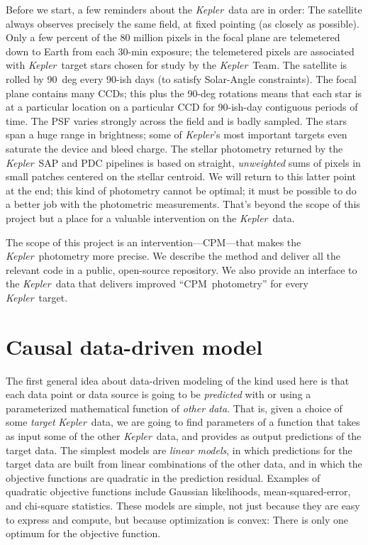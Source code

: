 \documentclass[12pt, preprint]{aastex}
\newcommand{\project}[1]{\textsl{#1}}
\newcommand{\Kepler}{\project{Kepler}}
\newcommand{\name}{CPM}
\begin{document}
Before we start, a few reminders about the \Kepler\ data are in order:
The satellite always observes precisely the same field, at fixed pointing (as closely as possible).
Only a few percent of the 80 million pixels in the focal plane are telemetered down
  to Earth from each 30-min exposure;
  the telemetered pixels are associated with \Kepler\ target stars chosen for study by the \Kepler\ Team.
The satellite is rolled by 90~deg every 90-ish days (to satisfy Solar-Angle constraints).
The focal plane contains many CCDs;
  this plus the 90-deg rotations means that each star is at a particular location
  on a particular CCD for 90-ish-day contiguous periods of time.
The PSF varies strongly across the field and is badly sampled.
The stars span a huge range in brightness;
  some of \Kepler's most important targets even saturate the device and bleed charge.
The stellar photometry returned by the \Kepler\ SAP and PDC pipelines is based on
  straight, \emph{unweighted} sums of pixels in small patches centered on the stellar centroid.
We will return to this latter point at the end;
  this kind of photometry cannot be optimal;
  it must be possible to do a better job with the photometric measurements.
That's beyond the scope of this project but a place for a valuable intervention on the \Kepler\ data.

The scope of this project is an intervention---\name---that makes the \Kepler\ photometry more precise.
We describe the method and deliver all the relevant code in a public, open-source repository.
We also provide an interface to the \Kepler\ data that delivers improved ``\name\ photometry''
  for every \Kepler\ target.

\section{Causal data-driven model}

The first general idea about data-driven modeling of the kind used here
  is that each data point or data source is going to be 
  \emph{predicted} with or using a parameterized mathematical function of \emph{other data}.
That is, given a choice of some \emph{target} \Kepler\ data,
  we are going to find parameters of a function that takes as input some of the other \Kepler\ data,
  and provides as output predictions of the target data.
The simplest models are \emph{linear models},
  in which predictions for the target data are built from linear combinations of the other data,
  and in which the objective functions are quadratic in the prediction residual.
Examples of quadratic objective functions include Gaussian likelihoods, mean-squared-error, and chi-square statistics.
These models are simple,
  not just because they are easy to express and compute,
  but because optimization is convex:
There is only one optimum for the objective function.
\end{document}
